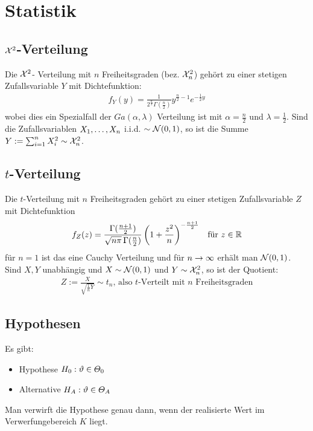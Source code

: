 {\section{Statistik}}
\subsection*{$\mathcal{X}^2$-Verteilung}
Die $\mathcal{X}^2$- Verteilung mit $n$ Freiheitsgraden (bez. $\mathcal{X}^2_n$) gehört zu einer
stetigen Zufallsvariable $Y$ mit Dichtefunktion:
\begin{align*}
  f_Y (y) = \frac{1}{2^{\frac{n}{2}}  \Gamma (\frac{n}{2})} y^{\frac{n}{2} - 1} e^{-\frac{1}{2} y}
\end{align*}
wobei dies ein Spezialfall der $Ga (\alpha, \lambda)$ Verteilung ist mit
$\alpha = \frac{n}{2}$ und $\lambda = \frac{1}{2}$. Sind die Zufallsvariablen
$X_1, \dots, X_n$ i.i.d. $\sim \mathcal{N} (0, 1)$, so ist die Summe
$Y := \sum_{i = 1}^n X_i^2 \sim \mathcal{X}^2_n$.
\subsection*{$t$-Verteilung}
Die $t$-Verteilung mit $n$ Freiheitsgraden gehört zu einer stetigen
Zufallsvariable $Z$ mit Dichtefunktion
\begin{align*}
  f_Z (z) = \frac{\Gamma (\frac{n+1}{2})}{\sqrt{n \pi} \, \Gamma (\frac{n}{2})} \left( 1 + \frac{z^2}{n} \right)^{-\frac{n+1}{2}}
   &  & \text{für } z \in \mathbb{R}
\end{align*}
für $n = 1$ ist das eine Cauchy Verteilung und für $n \rightarrow \infty$ erhält man
$\mathcal{N} (0, 1)$. Sind $X, Y$ unabhängig und $X \sim \mathcal{N} (0, 1)$
und $Y \sim \mathcal{X}^2_n$, so ist der Quotient:
\begin{align*}
  Z := \frac{X}{\sqrt{\frac{1}{n} Y}} \sim t_n \text{, also $t$-Verteilt mit $n$ Freiheitsgraden}
\end{align*}
\subsection*{Hypothesen}
Es gibt:
\begin{itemize}
  \item Hypothese $H_0 : \vartheta \in \varTheta_0$
  \item Alternative $H_A : \vartheta \in \varTheta_A$
\end{itemize}
Man verwirft die Hypothese genau dann, wenn der realisierte Wert im
Verwerfungebereich $K$ liegt.
